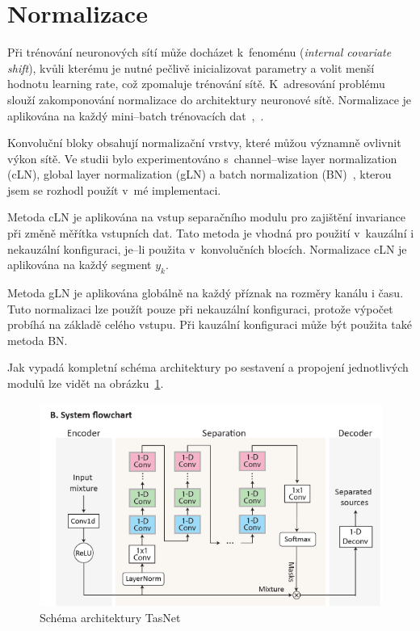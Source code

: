 

\section{Normalizace}
Při trénování neuronových sítí může docházet k~fenoménu  (\textit{internal covariate shift}), kvůli kterému je nutné pečlivě inicializovat parametry a volit menší hodnotu learning rate, což zpomaluje trénování sítě. K~adresování problému slouží zakomponování normalizace do architektury neuronové sítě. Normalizace je aplikována na každý mini--batch trénovacích dat~\cite{ioffe2015batch},~\cite{ba2016layer}.

Konvoluční bloky obsahují normalizační vrstvy, které můžou významně ovlivnit výkon sítě. Ve studii bylo experimentováno s~channel--wise layer normalization (cLN), global layer normalization (gLN) a batch normalization (BN)~\cite{ioffe2015batch}, kterou jsem se rozhodl použít v~mé implementaci.

Metoda cLN je aplikována na vstup separačního modulu pro zajištění invariance při změně měřítka vstupních dat. Tato metoda je vhodná pro použití v~kauzální i nekauzální konfiguraci, je--li použita v~konvolučních blocích. Normalizace cLN je aplikována na každý segment $y_k$. 

Metoda gLN je aplikována globálně na každý příznak na rozměry kanálu i času. Tuto normalizaci lze použít pouze při nekauzální konfiguraci, protože výpočet probíhá na základě celého vstupu.
Při kauzální konfiguraci může být použita také metoda BN.

\bigskip

Jak vypadá kompletní schéma architektury po sestavení a propojení jednotlivých modulů lze vidět na obrázku~\ref{fig:tasnet-modul}. 

\begin{figure}[H]
    \centering
    \includegraphics[scale=0.7]{obrazky-figures/tasnet-architecture.png}
    \caption{\label{fig:tasnet-modul}Schéma architektury TasNet}
\end{figure}


